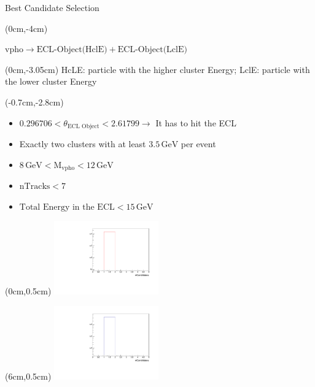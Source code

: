 \documentclass[10pt]{beamer}
\begin{document}
	
\begin{frame}{Best Candidate Selection}
	
	\begin{textblock*}{\textwidth}(0cm,-4cm)
		\begin{center}	
			$\textrm{vpho} \rightarrow \textrm{ECL-Object(HclE)} + \textrm{ECL-Object(LclE)}$	
		\end{center}

	\end{textblock*}
	
	\begin{textblock*}{\textwidth}(0cm,-3.05cm)
		\scriptsize{		HcLE: particle with the higher cluster Energy; 	
		LclE: particle with the lower cluster Energy
}		
	\end{textblock*}

	
	
	
	\begin{textblock*}{1.2\textwidth}(-0.7cm,-2.8cm)
		

	
	
	\begin{itemize}
		
		\item $0.296706 < \theta_{\textrm{ECL Object}} < 2.61799 \rightarrow$ It has to hit the ECL
		\item Exactly two clusters with at least $3.5\,\textrm{GeV}$ per event
		\item $8\,\textrm{GeV} < \textrm{M}_{\textrm{vpho}} < 12\,\textrm{GeV}$
		\item $\textrm{nTracks} < 7$ 
		\item $\textrm{Total Energy in the ECL} < 15\,\textrm{GeV}$
						
		\end{itemize}

	\end{textblock*}


\begin{textblock*}{0.5\textwidth}(0cm,0.5cm)
	\includegraphics[width=4.5cm]{Plots/nCandMC}
\end{textblock*}


	
\begin{textblock*}{0.5\textwidth}(6cm,0.5cm)
	\includegraphics[width=4.5cm]{Plots/nCandData}
\end{textblock*}
	

\end{frame}
\end{document}
